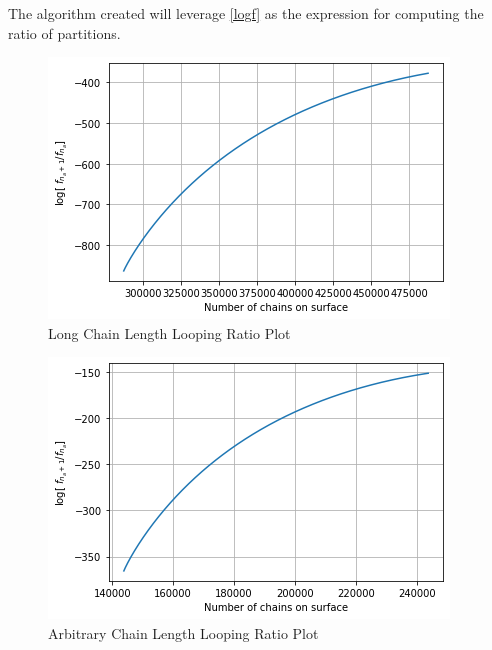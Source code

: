 \documentclass[10pt,letterpaper]{article}
\begin{document}
The algorithm created will leverage \ref{logf} as the expression for computing the ratio of partitions.

\begin{figure}[h!]
	\centering
	\includegraphics[scale=0.85]{plotFigure_2.png}
	\caption{Long Chain Length Looping Ratio Plot}
	\label{Long}
\end{figure}


\begin{figure}[h!]
	\centering
	\includegraphics[scale=0.85]{plotFigure_3.png}
	\caption{Arbitrary Chain Length Looping Ratio Plot}
	\label{Arbitrary}
\end{figure}
\end{document}
